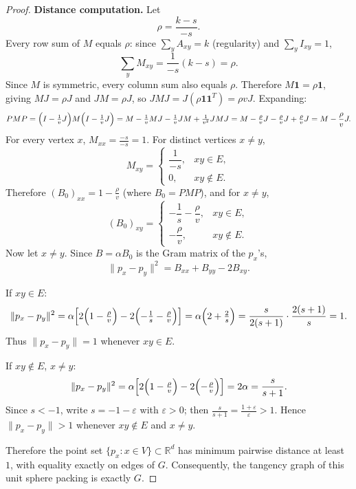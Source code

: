 \begin{proof}
\textbf{Distance computation.} Let
\[
\rho=\frac{k-s}{-s}.
\]
Every row sum of $M$ equals $\rho$: since $\sum_y A_{xy}=k$ (regularity) and $\sum_y I_{xy}=1$,
\[
\sum_y M_{xy}=\frac{1}{-s}(k-s)=\rho.
\]
Since $M$ is symmetric, every column sum also equals $\rho$. Therefore $M\mathbf{1}=\rho\mathbf{1}$, giving $MJ=\rho J$ and $JM=\rho J$, so $JMJ=J(\rho\mathbf{1}\mathbf{1}^T)=\rho v J$. Expanding:
\[
PMP=\Bigl(I-\tfrac{1}{v}J\Bigr)M\Bigl(I-\tfrac{1}{v}J\Bigr)
=M-\tfrac{1}{v}MJ-\tfrac{1}{v}JM+\tfrac{1}{v^2}JMJ
=M-\tfrac{\rho}{v}J-\tfrac{\rho}{v}J+\tfrac{\rho}{v}J
=M-\frac{\rho}{v}J.
\]
For every vertex $x$, $M_{xx}=\frac{-s}{-s}=1$. For distinct vertices $x\neq y$,
\[
M_{xy}=
\begin{cases}
\dfrac{1}{-s}, & xy\in E,\\[4pt]
0, & xy\notin E.
\end{cases}
\]
Therefore $(B_0)_{xx}=1-\frac{\rho}{v}$ (where $B_0=PMP$), and for $x\neq y$,
\[
(B_0)_{xy}=
\begin{cases}
-\dfrac{1}{s}-\dfrac{\rho}{v}, & xy\in E,\\[6pt]
-\dfrac{\rho}{v}, & xy\notin E.
\end{cases}
\]
Now let $x\neq y$. Since $B=\alpha B_0$ is the Gram matrix of the $p_x$'s,
\[
\|p_x-p_y\|^2 = B_{xx}+B_{yy}-2B_{xy}.
\]

If $xy\in E$:
\[
\|p_x-p_y\|^2
=\alpha\Bigl[2\Bigl(1-\tfrac{\rho}{v}\Bigr)-2\Bigl(-\tfrac{1}{s}-\tfrac{\rho}{v}\Bigr)\Bigr]
=\alpha\Bigl(2+\tfrac{2}{s}\Bigr)
=\frac{s}{2(s+1)}\cdot\frac{2(s+1)}{s}=1.
\]
Thus $\|p_x-p_y\|=1$ whenever $xy\in E$.

If $xy\notin E$, $x\neq y$:
\[
\|p_x-p_y\|^2
=\alpha\Bigl[2\Bigl(1-\tfrac{\rho}{v}\Bigr)-2\Bigl(-\tfrac{\rho}{v}\Bigr)\Bigr]
=2\alpha=\frac{s}{s+1}.
\]
Since $s<-1$, write $s=-1-\varepsilon$ with $\varepsilon>0$; then $\frac{s}{s+1}=\frac{1+\varepsilon}{\varepsilon}>1$. Hence $\|p_x-p_y\|>1$ whenever $xy\notin E$ and $x\neq y$.

Therefore the point set $\{p_x:x\in V\}\subset\mathbb R^d$ has minimum pairwise distance at least $1$, with equality exactly on edges of $G$. Consequently, the tangency graph of this unit sphere packing is exactly $G$.
\end{proof}
